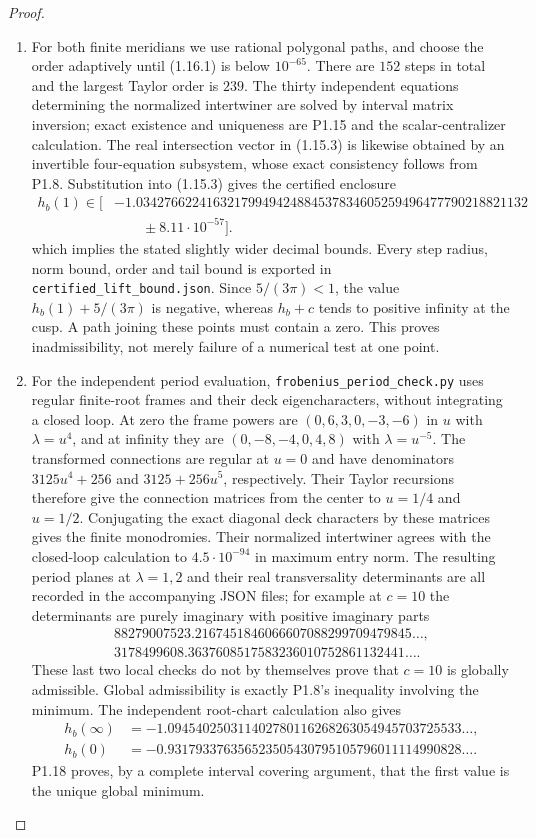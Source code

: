 \begin{proof}
\begin{enumerate}[label=\arabic*.]
\item For both finite meridians we use rational polygonal paths, and choose
the order adaptively until (1.16.1) is below $10^{-65}$.
There are $152$ steps in total and the largest Taylor order is $239$.
The thirty independent equations determining the normalized
intertwiner are solved by interval matrix inversion; exact existence
and uniqueness are P1.15 and the scalar-centralizer calculation.
The real intersection vector in (1.15.3) is likewise obtained by an
invertible four-equation subsystem, whose exact consistency follows
from P1.8.  Substitution into (1.15.3) gives the certified enclosure
\[
\begin{aligned}
h_b(1)\in\bigl[&
-1.03427662241632179949424884537834605259496477790218821132\\
&\qquad\mathbin{\pm}8.11\cdot10^{-57}\bigr].
\end{aligned}
\]
which implies the stated slightly wider decimal bounds.
Every step radius, norm bound, order and tail bound is exported in
\texttt{certified\_lift\_bound.json}.  Since $5/(3\pi)<1$, the value
$h_b(1)+5/(3\pi)$ is negative, whereas $h_b+c$ tends to positive
infinity at the cusp.  A path joining these points must contain a
zero.  This proves inadmissibility, not merely failure of a numerical
test at one point.

\item For the independent period evaluation,
\texttt{frobenius\_period\_check.py} uses regular finite-root frames
and their deck eigencharacters, without integrating a closed loop.
At zero the frame powers are $(0,6,3,0,-3,-6)$ in $u$ with
$\lambda=u^4$, and at infinity they are
$(0,-8,-4,0,4,8)$ with $\lambda=u^{-5}$.
The transformed connections are regular at $u=0$ and have denominators
$3125u^4+256$ and $3125+256u^5$, respectively.
Their Taylor recursions therefore give the connection matrices from
the center to $u=1/4$ and $u=1/2$.  Conjugating the exact diagonal
deck characters by these matrices gives the finite monodromies.
Their normalized intertwiner agrees with the closed-loop calculation
to $4.5\cdot10^{-94}$ in maximum entry norm.
The resulting period planes at $\lambda=1,2$ and their real
transversality determinants are all recorded in the accompanying
JSON files; for example at $c=10$ the determinants are purely imaginary
with positive imaginary parts
\[
\begin{gathered}
88279007523.2167451846066607088299709479845\ldots,\\
3178499608.3637608517583236010752861132441\ldots.
\end{gathered}
\]
These last two local checks do not by themselves prove that $c=10$
is globally admissible.  Global admissibility is exactly P1.8's
inequality involving the minimum.  The independent root-chart
calculation also gives
\[
\begin{split}
h_b(\infty)&=-1.094540250311402780116268263054945703725533\ldots,\\
h_b(0)&=-0.931793376356523505430795105796011114990828\ldots.
\end{split}
\]
P1.18 proves, by a complete interval covering argument, that the
first value is the unique global minimum.


\end{enumerate}
\end{proof}

